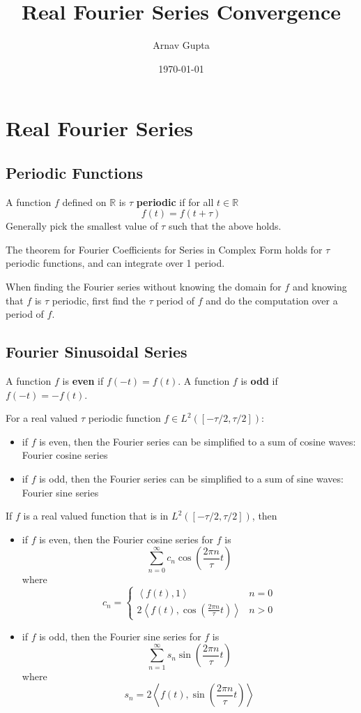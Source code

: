 \documentclass[11pt]{article}
\author{Arnav Gupta}
\date{\today}
\title{Real Fourier Series Convergence}
\begin{document}
\maketitle
\tableofcontents

\section{Real Fourier Series}
\label{sec:org594112e}
\subsection{Periodic Functions}
\label{sec:org95f9207}
A function \(f\) defined on \(\mathbb{R}\) is \(\tau\) \textbf{periodic} if for all \(t \in \mathbb{R}\)
$$
f(t) = f(t + \tau)
$$
Generally pick the smallest value of \(\tau\) such that the above holds.

The theorem for Fourier Coefficients for Series in Complex Form holds for \(\tau\) periodic
functions, and can integrate over 1 period.

When finding the Fourier series without knowing the domain for \(f\) and knowing that \(f\) is \(\tau\)
periodic, first find the \(\tau\) period of \(f\) and do the computation over a period of \(f\).
\subsection{Fourier Sinusoidal Series}
\label{sec:org272d119}
A function \(f\) is \textbf{even} if \(f(-t) = f(t)\).
A function \(f\) is \textbf{odd} if \(f(-t) = -f(t)\).

For a real valued \(\tau\) periodic function \(f \in L^{2}([-\tau/2,\tau/2])\):
\begin{itemize}
\item if \(f\) is even, then the Fourier series can be simplified to a sum of cosine waves: Fourier
cosine series
\item if \(f\) is odd, then the Fourier series can be simplified to a sum of sine waves: Fourier
sine series
\end{itemize}

If \(f\) is a real valued function that is in \(L^{2}([-\tau/2,\tau/2])\), then
\begin{itemize}
\item if \(f\) is even, then the Fourier cosine series for \(f\) is
$$
  \sum_{n=0}^{\infty}c_{n} \cos\left( \frac{2\pi n}{\tau} t \right)
  $$
where
$$
  c_{n} = \begin{cases}
        \left< f(t), 1 \right> & n = 0 \\
        2\left< f(t), \cos \left( \frac{2\pi n}{\tau} t \right) \right> & n > 0
  \end{cases}
  $$
\item if \(f\) is odd, then the Fourier sine series for \(f\) is
$$
  \sum_{n=1}^{\infty}s_{n} \sin\left( \frac{2\pi n}{\tau} t \right)
  $$
where
$$
  s_{n} = 2\left< f(t), \sin \left( \frac{2\pi n}{\tau} t \right) \right>
  $$
\end{itemize}
\end{document}
